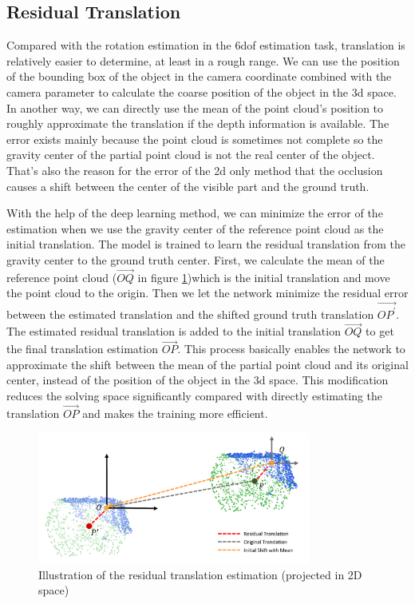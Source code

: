\documentclass[12pt,DIV14,BCOR12mm,a4paper,footinclude=false,headinclude,parskip=half-,twoside,openright,cleardoublepage=empty,toc=index,bibliography=totoc,listof=totoc]{scrreprt}
\numberwithin{equation}{chapter}
\begin{document}
\subsection{Residual Translation}\label{sec:res_t}
Compared with the rotation estimation in the \gls{6dof} estimation task, translation is relatively easier to determine, at least in a rough range. We can use the position of the bounding box of the object in the camera coordinate combined with the camera parameter to calculate the coarse position of the object in the \gls{3d} space. In another way, we can directly use the mean of the point cloud's position to roughly approximate the translation if the depth information is available. The error exists mainly because the point cloud is sometimes not complete so the gravity center of the partial point cloud is not the real center of the object. That's also the reason for the error of the \gls{2d} only method that the occlusion causes a shift between the center of the visible part and the ground truth.

With the help of the deep learning method, we can minimize the error of the estimation when we use the gravity center of the reference point cloud as the initial translation. The model is trained to learn the residual translation from the gravity center to the ground truth center. First, we calculate the mean of the reference point cloud ($\overrightarrow{OQ}$ in figure \ref{img:res_t})which is the initial translation and move the point cloud to the origin. Then we let the network minimize the residual error between the estimated translation and the shifted ground truth translation $\overrightarrow{OP^{'}}$. The estimated residual translation is added to the initial translation $\overrightarrow{OQ}$ to get the final translation estimation $\overrightarrow{OP} $. This process basically enables the network to approximate the shift between the mean of the partial point cloud and its original center, instead of the position of the object in the \gls{3d} space. This modification reduces the solving space significantly compared with directly estimating the translation $\overrightarrow{OP} $ and makes the training more efficient.

\begin{figure}[h]
	\centering
	\includegraphics[width=0.8\textwidth]{img/res_t.pdf}
	\caption{Illustration of the residual translation estimation (projected in 2D space)}
	\label{img:res_t}
\end{figure}
\end{document}
